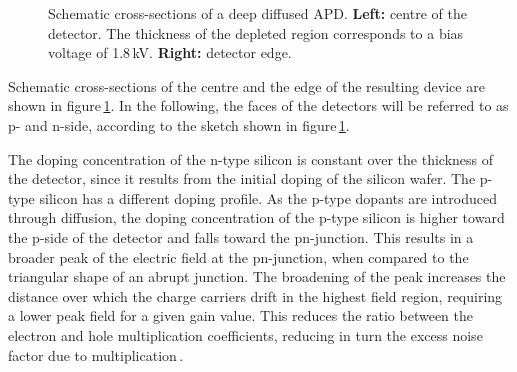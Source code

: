 \documentclass{article}
\begin{document}
\begin{figure}
  \centering
  \hfill
  \caption{Schematic cross-sections of a deep diffused APD. {\bf Left:} centre of the detector. The thickness of the depleted region corresponds to a bias voltage of 1.8\,kV. {\bf Right:} detector edge.}
  \label{fig:apdDia}
\end{figure}

Schematic cross-sections of the centre and the edge of the resulting device are shown in figure\,\ref{fig:apdDia}.
In the following, the faces of the detectors will be referred to as p- and n-side, according to the sketch shown in figure\,\ref{fig:apdDia}.

The doping concentration of the n-type silicon is constant over the thickness of the detector, since it results from the initial doping of the silicon wafer.
The p-type silicon has a different doping profile.
As the p-type dopants are introduced through diffusion, the doping concentration of the p-type silicon is higher toward the p-side of the detector and falls toward the pn-junction.
This results in a broader peak of the electric field at the pn-junction, when compared to the triangular shape of an abrupt junction.
The broadening of the peak increases the distance over which the charge carriers drift in the highest field region, requiring a lower peak field for a given gain value.
This reduces the ratio between the electron and hole multiplication coefficients, reducing in turn the excess noise factor due to multiplication\,\cite{theoryDDAPD}.
\end{document}
